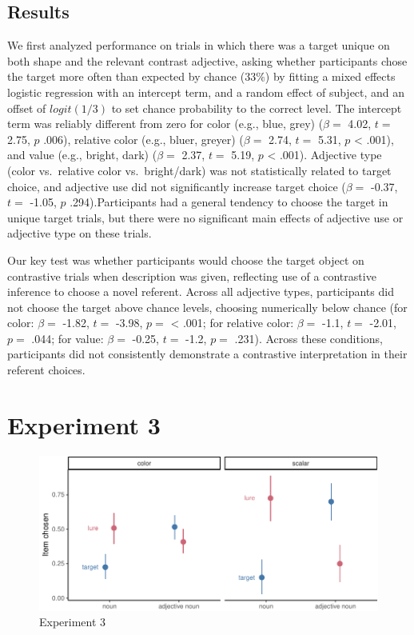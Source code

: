 \documentclass[10pt, letterpaper]{article}
\newenvironment{CodeChunk}{}{}
\begin{document}
\subsection{Results}\label{results-1}

We first analyzed performance on trials in which there was a target
unique on both shape and the relevant contrast adjective, asking whether
participants chose the target more often than expected by chance
(\(33\%\)) by fitting a mixed effects logistic regression with an
intercept term, and a random effect of subject, and an offset of
\(logit(1/3)\) to set chance probability to the correct level. The
intercept term was reliably different from zero for color (e.g., blue,
grey) (\(\beta =\) 4.02, \(t =\) 2.75, \(p\) .006), relative color
(e.g., bluer, greyer) (\(\beta =\) 2.74, \(t =\) 5.31, \(p\) \textless{}
.001), and value (e.g., bright, dark) (\(\beta =\) 2.37, \(t =\) 5.19,
\(p\) \textless{} .001). Adjective type (color vs.~relative color
vs.~bright/dark) was not statistically related to target choice, and
adjective use did not significantly increase target choice (\(\beta =\)
-0.37, \(t =\) -1.05, \(p\) .294).Participants had a general tendency to
choose the target in unique target trials, but there were no significant
main effects of adjective use or adjective type on these trials.

Our key test was whether participants would choose the target object on
contrastive trials when description was given, reflecting use of a
contrastive inference to choose a novel referent. Across all adjective
types, participants did not choose the target above chance levels,
choosing numerically below chance (for color: \(\beta =\) -1.82, \(t =\)
-3.98, \(p =\) \textless{} .001; for relative color: \(\beta =\) -1.1,
\(t =\) -2.01, \(p =\) .044; for value: \(\beta =\) -0.25, \(t =\) -1.2,
\(p =\) .231). Across these conditions, participants did not
consistently demonstrate a contrastive interpretation in their referent
choices.

\section{Experiment 3}\label{experiment-3}

\begin{CodeChunk}
\begin{figure}[tb]

{\centering \includegraphics{figs/e3_fig-1} 

}

\caption[Experiment 3]{Experiment 3}\label{fig:e3_fig}
\end{figure}
\end{CodeChunk}
\end{document}
